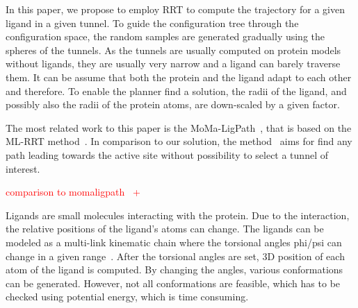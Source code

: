 \documentclass{svmult}
\newcommand{\red}[1]{\textcolor{red}{#1}}
\begin{document}

In this paper, we propose to employ RRT to compute the trajectory for a given ligand in a given tunnel.
To guide the configuration tree through the configuration space, the random samples are generated gradually using the spheres of the tunnels.
As the tunnels are usually computed on protein models without ligands, they are usually very narrow and a ligand can barely traverse them.
It can be assume that both the protein and the ligand adapt to each other and therefore.
To enable the planner find a solution, the radii of the ligand, and possibly also the radii of the protein atoms, are down-scaled
by a given factor.

The most related work to this paper is the MoMa-LigPath~\cite{cortes2005path}, that is based on the ML-RRT method~\cite{cortes2010simulating,cortes2007mlrrt}.
In comparison to our solution, the method~\cite{cortes2005path} aims for find any path leading towards the active site without
possibility to select a tunnel of interest.


\red{comparison to momaligpath~\cite{cortes2005path} + \cite{guieysse2008structure} }

Ligands are small molecules interacting with the protein. 
Due to the interaction, the relative positions of the ligand's atoms can change.
The ligands can be modeled as a multi-link kinematic chain where the torsional angles phi/psi can change in a given range~\cite{songPFpath}.
After the torsional angles are set, 3D position of each atom of the ligand is computed.
By changing the angles, various conformations can be generated.
However, not all conformations are feasible, which has to be checked using potential energy, which is time consuming.


\end{document}
